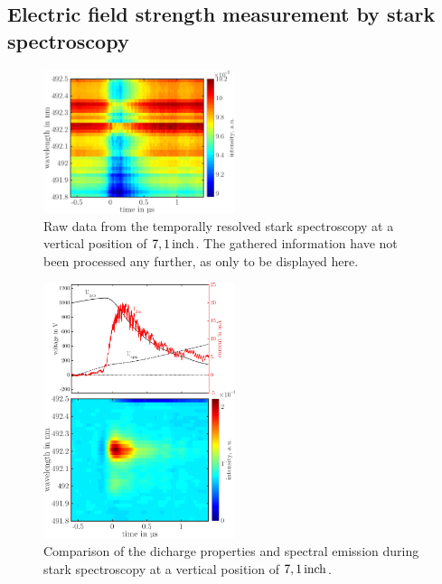 \documentclass[a4paper,10pt,twoside]{article}
\begin{document}
			\begin{multicols}{2}
				
			\end{multicols}
			
			\twocolumn
		
		\subsection{Electric field strength measurement by stark spectroscopy}
		
				\begin{figure}[h]
					\centering
					\includegraphics[width=0.5\textwidth]{figures/stark/stark_71inraw.pdf}
					\caption{Raw data from the temporally resolved stark spectroscopy at a vertical position of $\unit[7,1]{inch}$. The gathered information have not been processed any further, as only to be displayed here.}
				\end{figure}

				\begin{figure}
					\centering
						\includegraphics[width=0.5\textwidth]{figures/stark/stark71combination.pdf}
					\caption{Comparison of the dicharge properties and spectral emission during stark spectroscopy at a vertical position of $\unit[7,1]{inch}$. }
					\label{img:stark71comparison}
				\end{figure}
\end{document}
